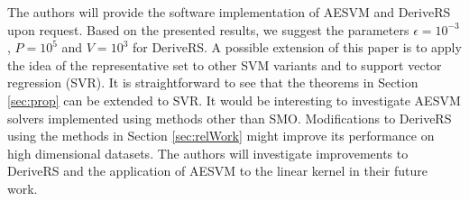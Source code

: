 \documentclass[twoside]{article}
\begin{document}
The authors will provide the software implementation of AESVM and DeriveRS upon request. Based on the presented results, we suggest the parameters $\epsilon = 10^{-3}$, $P = 10^5$ and $V = 10^3$ for DeriveRS. A possible extension of this paper is to apply the idea of the representative set to other SVM variants and to support vector regression (SVR). It is straightforward to see that the theorems in Section \ref{sec:prop} can be extended to SVR. It would be interesting to investigate AESVM solvers implemented using methods other than SMO. Modifications to DeriveRS using the methods in Section \ref{sec:relWork} might improve its performance on high dimensional datasets. The authors will investigate improvements to DeriveRS and the application of AESVM to the linear kernel in their future work.

\end{document}
